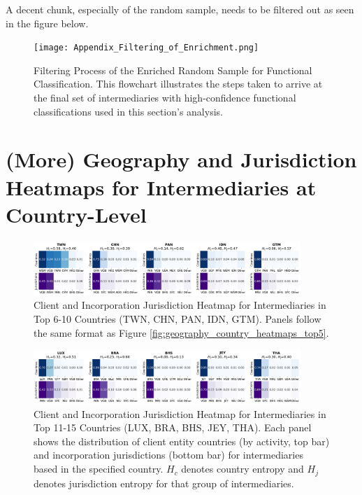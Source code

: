 A decent chunk, especially of the random sample, needs to be filtered out as seen in the figure below.

\begin{figure}[htbp]
    \centering
    \texttt{[image: Appendix\_Filtering\_of\_Enrichment.png]}
    \caption{Filtering Process of the Enriched Random Sample for Functional Classification. This flowchart illustrates the steps taken to arrive at the final set of intermediaries with high-confidence functional classifications used in this section's analysis.}
    \label{fig:appendix_filtering_enrichment}
\end{figure}


\section{(More) Geography and Jurisdiction Heatmaps for Intermediaries at Country-Level}

\begin{figure}[htbp]
    \centering
    \includegraphics[width=0.9\textwidth]{images/Geography_Country_Heatmaps_Top6_10.png}
    \caption{Client and Incorporation Jurisdiction Heatmap for Intermediaries in Top 6-10 Countries (TWN, CHN, PAN, IDN, GTM). Panels follow the same format as Figure \ref{fig:geography_country_heatmaps_top5}.}
    \label{fig:geography_country_heatmaps_top6_10}
\end{figure}
\begin{figure}[htbp]
    \centering
    \includegraphics[width=0.9\textwidth]{images/Geography_Country_Heatmaps_Top11_15.png}
    \caption{Client and Incorporation Jurisdiction Heatmap for Intermediaries in Top 11-15 Countries (LUX, BRA, BHS, JEY, THA). Each panel shows the distribution of client entity countries (by activity, top bar) and incorporation jurisdictions (bottom bar) for intermediaries based in the specified country. $H_c$ denotes country entropy and $H_j$ denotes jurisdiction entropy for that group of intermediaries.}
    \label{fig:geography_country_heatmaps_top11_15}
\end{figure}

